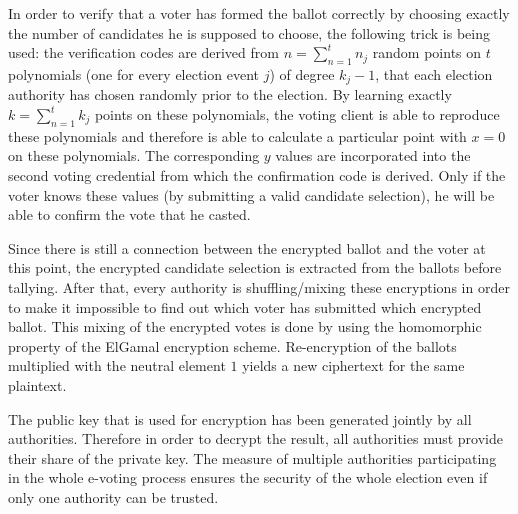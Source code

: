 In order to verify that a voter has formed the ballot correctly by choosing exactly the number of candidates he is supposed to choose, the following trick is being used: the verification codes are derived from $n = \sum_{n=1}^{t} n_j$ random points on $t$ polynomials (one for every election event $j$) of degree $k_j - 1$, that each election authority has chosen randomly prior to the election. By learning exactly $k = \sum_{n=1}^{t} k_j$ points on these polynomials, the voting client is able to reproduce these polynomials and therefore is able to calculate a particular point with $x=0$ on these polynomials. The corresponding $y$ values are incorporated into the second voting credential from which the confirmation code is derived. Only if the voter knows these values (by submitting a valid candidate selection), he will be able to confirm the vote that he casted.

Since there is still a connection between the encrypted ballot and the voter at this point, the encrypted candidate selection is extracted from the ballots before tallying. After that, every authority is shuffling/mixing these encryptions in order to make it impossible to find out which voter has submitted which encrypted ballot. This mixing of the encrypted votes is done by using the homomorphic property of the ElGamal encryption scheme. Re-encryption of the ballots multiplied with the neutral element $1$ yields a new ciphertext for the same plaintext.

The public key that is used for encryption has been generated jointly by all authorities. Therefore in order to decrypt the result, all authorities must provide their share of the private key. The measure of multiple authorities participating in the whole e-voting process ensures the security of the whole election even if only one authority can be trusted.
